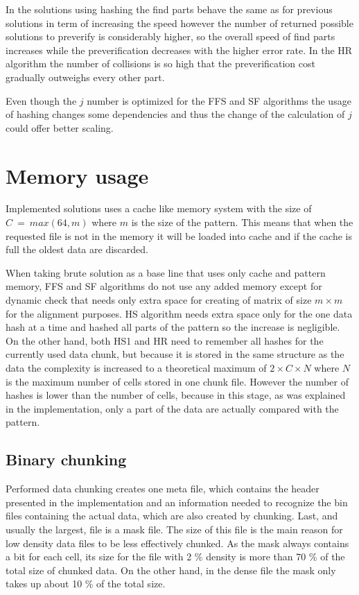 In the solutions using hashing the find parts behave the same as for previous solutions in term of increasing the speed however the number of returned possible solutions to preverify is considerably higher, so the overall speed of find parts increases while the preverification decreases with the higher error rate. In the HR algorithm the number of collisions is so high that the preverification cost gradually outweighs every other part.

Even though the $j$ number is optimized for the FFS and SF algorithms the usage of hashing changes some dependencies and thus the change of the calculation of $j$ could offer better scaling.

\section{Memory usage} \label{memoryuse}
Implemented solutions uses a cache like memory system with the size of $C~=~max(64, m)$ where $m$ is the size of the pattern. This means that when the requested file is not in the memory it will be loaded into cache and if the cache is full the oldest data are discarded. 

When taking brute solution as a base line that uses only cache and pattern memory, FFS and SF algorithms do not use any added memory except for dynamic check that needs only extra space for creating of matrix of size $m\times m$ for the alignment purposes. HS algorithm needs extra space only for the one data hash at a time and hashed all parts of the pattern so the increase is negligible. On the other hand, both HS1 and HR need to remember all hashes for the currently used data chunk, but because it is stored in the same structure as the data the complexity is increased to a theoretical maximum of $2\times C \times N$ where $N$ is the maximum number of cells stored in one chunk file. However the number of hashes is lower than the number of cells, because in this stage, as was explained in the implementation, only a part of the data are actually compared with the pattern.

\subsection{Binary chunking}
Performed data chunking creates one meta file, which contains the header presented in the implementation and an information needed to recognize the bin files containing the actual data, which are also created by chunking. Last, and usually the largest, file is a mask file. The size of this file is the main reason for low density data files to be less effectively chunked. As the mask always contains a bit for each cell, its size for the file with 2 \% density is more than 70 \% of the total size of chunked data. On the other hand, in the dense file the mask only takes up about 10 \% of the total size. 

